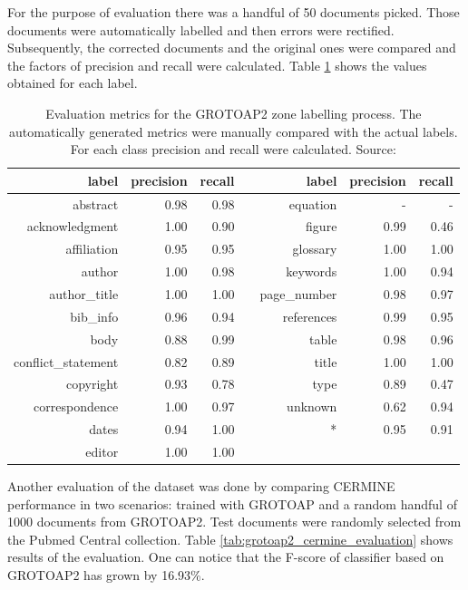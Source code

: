 \quad
For the purpose of evaluation there was a handful of 50 documents picked. Those documents were automatically labelled and then errors were rectified. Subsequently, the corrected documents and the original ones were compared and the factors of precision and recall were calculated. Table \ref{tab:grotoap2_evaluation} shows the values obtained for each label.

\begin{table}
\centering
\begin{tabular}{@{}rrrcrrr@{}}
 \toprule
label & precision & recall & \phantom{abc} & label & precision & recall\\ \midrule
abstract & 0.98 & 0.98 && equation & - & - \\ 
acknowledgment & 1.00 & 0.90 && figure & 0.99 & 0.46 \\ 
affiliation & 0.95 & 0.95 && glossary & 1.00 & 1.00 \\ 
author & 1.00 & 0.98 && keywords & 1.00 & 0.94 \\ 
author\_title & 1.00 & 1.00 && page\_number & 0.98 & 0.97 \\ 
bib\_info & 0.96 & 0.94 && references & 0.99 & 0.95 \\ 
body & 0.88 & 0.99 && table & 0.98 & 0.96 \\ 
conflict\_statement & 0.82 & 0.89 && title & 1.00 & 1.00 \\ 
copyright & 0.93 & 0.78 && type & 0.89 & 0.47 \\ 
correspondence & 1.00 & 0.97 && unknown & 0.62 & 0.94 \\ 
dates & 0.94 & 1.00 && * & 0.95 & 0.91 \\ 
editor & 1.00 & 1.00 &&   &      &       \\
\bottomrule
\end{tabular}
\caption{Evaluation metrics for the GROTOAP2 zone labelling process. The automatically generated metrics were manually compared with the actual labels. For each class precision and recall were calculated. Source: \cite{DominikaTkaczykPaweSzostek2014}}
\label{tab:grotoap2_evaluation}
\end{table}

Another evaluation of the dataset was done by comparing CERMINE performance in two scenarios: trained with GROTOAP and a random handful of 1000 documents from GROTOAP2. Test documents were randomly selected from the Pubmed Central collection. Table \ref{tab:grotoap2_cermine_evaluation} shows results of the evaluation. One can notice that the F-score of classifier based on GROTOAP2 has grown by 16.93\%.

